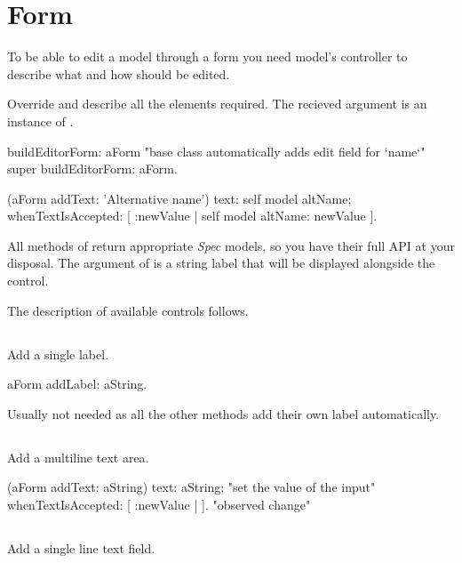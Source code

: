 \documentclass[a4paper,10pt,twoside]{book}
\begin{document}
\fi
\sloppy

\chapter{ Form}
To be able to edit a model through a form you need model's controller to describe what and how should be edited.

Override  and describe all the elements required. The recieved  argument is an instance of .


\begin{code}{}
buildEditorForm: aForm
	"base class automatically adds edit field for `name`"
	super buildEditorForm: aForm.

	(aForm addText: 'Alternative name')
		text: self model altName;
		whenTextIsAccepted: [ :newValue | self model altName: newValue ].
\end{code}


All  methods of  return appropriate \textit{Spec} models, so you have their full API at your disposal.
The argument of  is a string label that will be displayed alongside the control.

The description of available controls follows.
\section{ }
Add a single label.

\begin{code}{}
aForm addLabel: aString.
\end{code}

Usually not needed as all the other methods add their own label automatically.
\section{ }
Add a multiline text area.

\begin{code}{}
(aForm addText: aString)
	text: aString; "set the value of the input"
	whenTextIsAccepted: [ :newValue | ]. "observed change"
\end{code}

\section{ }
Add a single line text field.
\end{document}
